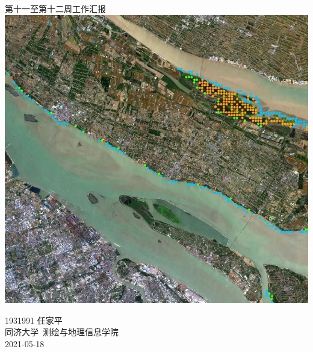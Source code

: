 \documentclass[a4paper, 12pt]{article}
\begin{document}
\begin{center}
    {\Huge 
        第十一至第十二周工作汇报}\\[20pt]
    
    \includegraphics[scale=0.6]{pic/cover.jpg}  

    {\Large 
        1931991 任家平\\[12pt]
        同济大学~测绘与地理信息学院\\[12pt]
        2021-05-18}
\end{center}
\thispagestyle{empty}



\newpage
{}
\tableofcontents
\newpage
{}





\newpage
\nocite{*}


\end{document}
